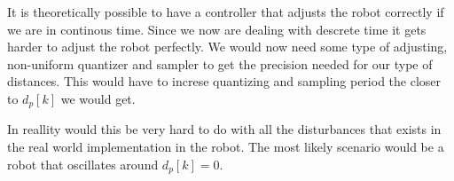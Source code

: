 It is theoretically possible to have a controller that adjusts the robot
correctly if we are in continous time. Since we now are dealing with
descrete time it gets harder to adjust the robot perfectly. We would now
need some type of adjusting, non-uniform quantizer and sampler to get
the precision needed for our type of distances. This would have to
increse quantizing and sampling period the closer to $d_p[k]$ we would
get.

In reallity would this be very hard to do with all the disturbances that
exists in the real world implementation in the robot. The most likely
scenario would be a robot that oscillates around $d_p[k]=0$.
